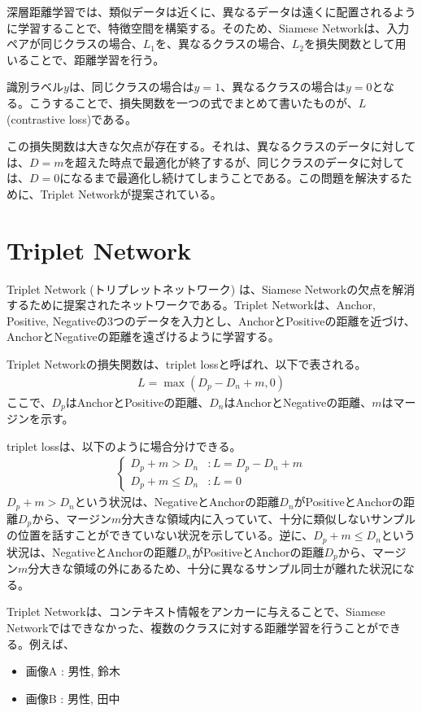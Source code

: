 \documentclass{ltjsarticle}
\begin{document}
深層距離学習では、類似データは近くに、異なるデータは遠くに配置されるように学習することで、特徴空間を構築する。そのため、Siamese Networkは、入力ペアが同じクラスの場合、$L_1$を、異なるクラスの場合、$L_2$を損失関数として用いることで、距離学習を行う。
\par
識別ラベル$y$は、同じクラスの場合は$y=1$、異なるクラスの場合は$y=0$となる。こうすることで、損失関数を一つの式でまとめて書いたものが、$L$(contrastive loss)である。
\par
この損失関数は大きな欠点が存在する。それは、異なるクラスのデータに対しては、$D=m$を超えた時点で最適化が終了するが、同じクラスのデータに対しては、$D=0$になるまで最適化し続けてしまうことである。この問題を解決するために、Triplet Networkが提案されている。

\clearpage
\section{Triplet Network}
Triplet Network (トリプレットネットワーク) は、Siamese Networkの欠点を解消するために提案されたネットワークである。Triplet Networkは、Anchor, Positive, Negativeの3つのデータを入力とし、AnchorとPositiveの距離を近づけ、AnchorとNegativeの距離を遠ざけるように学習する。
\par
Triplet Networkの損失関数は、triplet lossと呼ばれ、以下で表される。
\begin{align}
  L = \max(D_p- D_n + m, 0)
\end{align}
ここで、$D_p$はAnchorとPositiveの距離、$D_n$はAnchorとNegativeの距離、$m$はマージンを示す。
\par
triplet lossは、以下のように場合分けできる。
\begin{align}
  \begin{cases}
    D_p + m > D_n & : L = D_p - D_n + m\\
    D_p + m \leq D_n & : L = 0
  \end{cases}
\end{align}
$D_p+m > D_n$という状況は、NegativeとAnchorの距離$D_n$がPositiveとAnchorの距離$D_p$から、マージン$m$分大きな領域内に入っていて、十分に類似しないサンプルの位置を話すことができていない状況を示している。逆に、$D_p+m \leq D_n$という状況は、NegativeとAnchorの距離$D_n$がPositiveとAnchorの距離$D_p$から、マージン$m$分大きな領域の外にあるため、十分に異なるサンプル同士が離れた状況になる。
\par
Triplet Networkは、コンテキスト情報をアンカーに与えることで、Siamese Networkではできなかった、複数のクラスに対する距離学習を行うことができる。例えば、
\begin{itemize}
  \item 画像A : 男性, 鈴木
  \item 画像B : 男性, 田中
\end{itemize}
\end{document}
